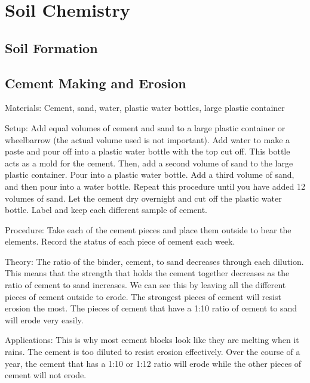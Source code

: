 \section{Soil Chemistry}

\begin{multicols}{2}


\section*{Soil Formation}


\subsection{Cement Making and Erosion}


\begin{description*}
\item[Materials:]{Cement, sand, water, plastic water bottles, large plastic container}
\item[Setup:]{Add equal volumes of cement and sand to a large plastic container or wheelbarrow (the actual volume used is not important). Add water to make a paste and pour off into a plastic water bottle with the top cut off. This bottle acts as a mold for the cement. Then, add a second volume of sand to the large plastic container. Pour into a plastic water bottle. Add a third volume of sand, and then pour into a water bottle. Repeat this procedure until you have added 12 volumes of sand. Let the cement dry overnight and cut off the plastic water bottle. Label and keep each different sample of cement.}
\item[Procedure:]{Take each of the cement pieces and place them outside to bear the elements. Record the status of each piece of cement each week.}
\item[Theory:]{The ratio of the binder, cement, to sand decreases through each dilution. This means that the strength that holds the cement together decreases as the ratio of cement to sand increases. We can see this by leaving all the different pieces of cement outside to erode. The strongest pieces of cement will resist erosion the most. The pieces of cement that have a 1:10 ratio of cement to sand will erode very easily.}
\item[Applications:]{This is why most cement blocks look like they are melting when it rains. The cement is too diluted to resist erosion effectively. Over the course of a year, the cement that has a 1:10 or 1:12 ratio will erode while the other pieces of cement will not erode.}
\end{description*}


\end{multicols}
